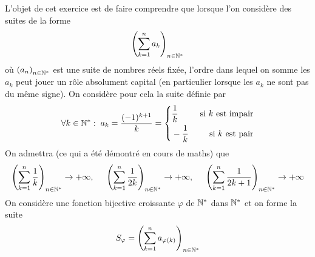 L'objet de cet exercice est de faire comprendre que lorsque l'on considère des suites de la forme
\begin{displaymath}
  \left( \sum_{k=1}^n a_k \right)_{n\in \mathbb{N}^*} 
\end{displaymath}
où $\left( a_n\right)_{n\in \mathbb{N}^*}$ est une suite de nombres réels fixée, l'ordre dans lequel on somme les $a_k$ peut jouer un rôle absolument capital (en particulier lorsque les $a_k$ ne sont pas du même signe).\newline
On considère pour cela la suite définie par
\begin{displaymath}
  \forall k\in \mathbb{N}^*:\;a_k = \frac{(-1)^{k+1}}{k}
  =
  \left\lbrace 
  \begin{aligned}
    &\frac{1}{k} &\text{ si $k$ est impair}\\
    &-\frac{1}{k} &\text{ si $k$ est pair}\\
  \end{aligned}
\right. 
\end{displaymath}
On admettra (ce qui a été démontré en cours de maths) que
\begin{displaymath}
    \left( \sum_{k=1}^n \frac{1}{k} \right)_{n\in \mathbb{N}^*}\rightarrow +\infty,\hspace{0.5cm}
    \left( \sum_{k=1}^n \frac{1}{2k} \right)_{n\in \mathbb{N}^*}\rightarrow +\infty,\hspace{0.5cm}
    \left( \sum_{k=1}^n \frac{1}{2k+1} \right)_{n\in \mathbb{N}^*}\rightarrow +\infty
\end{displaymath}
On considère une fonction bijective croissante $\varphi$ de $\mathbb{N}^*$ dans $\mathbb{N}^*$ et on forme la suite
\begin{displaymath}
  S_{\varphi} = \left( \sum_{k=1}^n a_{\varphi(k)} \right)_{n\in \mathbb{N}^*}
\end{displaymath}

